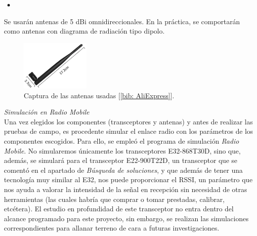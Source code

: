 \documentclass[12pt]{article}
\begin{document}
	\begin{itemize}
		\item 
	\end{itemize}
	
	\noindent Se usarán antenas de 5 dBi omnidireccionales. En la práctica, se comportarán como antenas con diagrama de radiación tipo dipolo.\\
	
	\begin{figure}[h]
		\begin{center}
			\includegraphics[width=0.3\textwidth]{img/antena_5dbi.png}
			\caption{Captura de las antenas usadas [\ref{bib: AliExpress}].}
			\label{Captura antenas 5dbi}
		\end{center}
	\end{figure}
	
	\noindent \textit{Simulación en Radio Mobile}\\
	
	\noindent Una vez elegidos los componentes (transceptores y antenas) y antes de realizar las pruebas de campo, es procedente simular el enlace radio con los parámetros de los componentes escogidos. Para ello, se empleó el programa de simulación \textit{Radio Mobile}. No simularemos únicamente los transceptores E32-868T30D, sino que, además, se simulará para el transceptor E22-900T22D, un transceptor que se comentó en el apartado de \textit{Búsqueda de soluciones}, y que además de tener una tecnología muy similar al E32, nos puede proporcionar el RSSI, un parámetro que nos ayuda a valorar la intensidad de la señal en recepción sin necesidad de otras herramientas (las cuales habría que comprar o tomar prestadas, calibrar, etcétera). El estudio en profundidad de este transceptor no entra dentro del alcance programado para este proyecto, sin embargo, se realizan las simulaciones correspondientes para allanar terreno de cara a futuras investigaciones.\\
	
\end{document}
